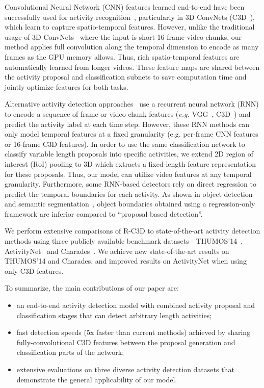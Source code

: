 \documentclass[10pt,twocolumn,letterpaper]{article}
\newcommand{\modelname}[0]{R-C3D }
\begin{document}
Convolutional Neural Network (CNN) features learned end-to-end have been  successfully used for activity recognition~\cite{karpathy2014large, simonyan2014two}, particularly in 3D ConvNets (C3D~\cite{tran2015learning}), which learn to capture spatio-temporal features.
However, unlike the traditional usage of 3D ConvNets~\cite{tran2015learning} where the input is short 16-frame video chunks, our method applies full convolution along the temporal dimension to encode as many frames as the GPU memory allows. Thus, rich spatio-temporal features are automatically learned from longer videos.
These feature maps are shared between the activity proposal  and classification subnets to save computation time and jointly optimize features for both tasks. 


Alternative activity detection approaches~\cite{escorcia2016daps, ma2016learning, montes2016temporal, Singh2016a, yeung2016end} use a recurrent neural network (RNN) to encode a sequence of frame or  video chunk features (\textit{e.g.} VGG~\cite{simonyan2014very}, C3D~\cite{tran2015learning}) and predict the activity label at each time step. However, these RNN methods can only model temporal features at a fixed granularity (e.g. per-frame CNN features or 16-frame C3D features). 
In order to use the same classification network to classify variable length proposals into specific activities, we extend 2D region of interest (RoI) pooling to 3D which extracts a fixed-length feature representation for these proposals. Thus, our model can utilize video features at any temporal granularity.
Furthermore, some RNN-based detectors rely on direct regression to predict the temporal boundaries for each activity.
As shown in object detection~\cite{girshick2014rich, Szegedy2013} and semantic segmentation~\cite{Carreira2012}, object boundaries obtained using a regression-only framework are inferior compared to ``proposal based detection''.

We perform extensive comparisons of \modelname to state-of-the-art activity detection methods  using three publicly available benchmark datasets - THUMOS'14~\cite{THUMOS14}, ActivityNet~\cite{caba2015activitynet} and Charades~\cite{sigurdsson2016hollywood}.
We achieve new state-of-the-art results on THUMOS'14 and Charades, and  improved results on ActivityNet when using only C3D features.


To summarize, the main contributions of our paper are:
\begin{itemize}[noitemsep,nolistsep]
    \item an end-to-end activity detection model with combined activity proposal and classification stages that can detect arbitrary length activities;
    \item fast detection speeds (5x faster than current methods) achieved by sharing fully-convolutional C3D features between the proposal generation and classification parts of the network;
    \item extensive evaluations on three diverse activity detection datasets that demonstrate the general applicability of our model.
\end{itemize}
\end{document}
